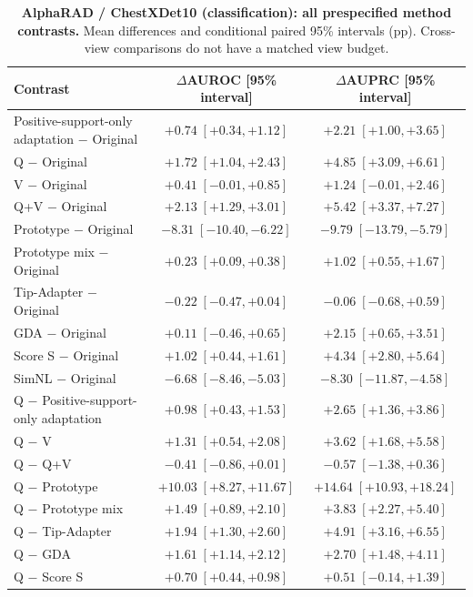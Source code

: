 \begin{table}[tp]
\centering
\caption{\textbf{AlphaRAD / ChestXDet10 (classification): all prespecified method contrasts.} Mean differences and conditional paired 95\% intervals (pp). Cross-view comparisons do not have a matched view budget.}
\label{tab:supp-oldci-alpharad-chestxdet10}
\footnotesize
\setlength{\tabcolsep}{4pt}
\begin{tabular*}{\textwidth}{@{\extracolsep{\fill}}lcc@{}}
\toprule
Contrast & $\Delta$AUROC [95\% interval] & $\Delta$AUPRC [95\% interval] \\
\midrule
Positive-support-only adaptation $-$ Original & $+0.74\;[+0.34,+1.12]$ & $+2.21\;[+1.00,+3.65]$ \\
Q $-$ Original & $+1.72\;[+1.04,+2.43]$ & $+4.85\;[+3.09,+6.61]$ \\
V $-$ Original & $+0.41\;[-0.01,+0.85]$ & $+1.24\;[-0.01,+2.46]$ \\
Q+V $-$ Original & $+2.13\;[+1.29,+3.01]$ & $+5.42\;[+3.37,+7.27]$ \\
Prototype $-$ Original & $-8.31\;[-10.40,-6.22]$ & $-9.79\;[-13.79,-5.79]$ \\
Prototype mix $-$ Original & $+0.23\;[+0.09,+0.38]$ & $+1.02\;[+0.55,+1.67]$ \\
Tip-Adapter $-$ Original & $-0.22\;[-0.47,+0.04]$ & $-0.06\;[-0.68,+0.59]$ \\
GDA $-$ Original & $+0.11\;[-0.46,+0.65]$ & $+2.15\;[+0.65,+3.51]$ \\
Score S $-$ Original & $+1.02\;[+0.44,+1.61]$ & $+4.34\;[+2.80,+5.64]$ \\
SimNL $-$ Original & $-6.68\;[-8.46,-5.03]$ & $-8.30\;[-11.87,-4.58]$ \\
Q $-$ Positive-support-only adaptation & $+0.98\;[+0.43,+1.53]$ & $+2.65\;[+1.36,+3.86]$ \\
Q $-$ V & $+1.31\;[+0.54,+2.08]$ & $+3.62\;[+1.68,+5.58]$ \\
Q $-$ Q+V & $-0.41\;[-0.86,+0.01]$ & $-0.57\;[-1.38,+0.36]$ \\
Q $-$ Prototype & $+10.03\;[+8.27,+11.67]$ & $+14.64\;[+10.93,+18.24]$ \\
Q $-$ Prototype mix & $+1.49\;[+0.89,+2.10]$ & $+3.83\;[+2.27,+5.40]$ \\
Q $-$ Tip-Adapter & $+1.94\;[+1.30,+2.60]$ & $+4.91\;[+3.16,+6.55]$ \\
Q $-$ GDA & $+1.61\;[+1.14,+2.12]$ & $+2.70\;[+1.48,+4.11]$ \\
Q $-$ Score S & $+0.70\;[+0.44,+0.98]$ & $+0.51\;[-0.14,+1.39]$ \\

\end{tabular*}
\end{table}
